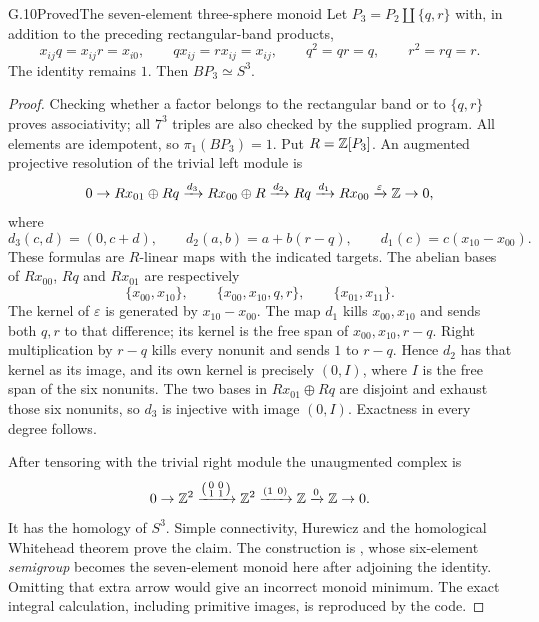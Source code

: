\begin{claim}{G.10}{Proved}{The seven-element three-sphere monoid}
Let $P_3=P_2\amalg\{q,r\}$ with, in addition to the preceding rectangular-band products,
\[
 x_{ij}q=x_{ij}r=x_{i0},\qquad qx_{ij}=rx_{ij}=x_{ij},
 \qquad q^2=qr=q,\qquad r^2=rq=r.
\]
The identity remains $1$. Then $BP_3\simeq S^3$.
\end{claim}
\begin{proof}
Checking whether a factor belongs to the rectangular band or to $\{q,r\}$ proves associativity; all $7^3$ triples are also checked by the supplied program. All elements are idempotent, so $\pi_1(BP_3)=1$. Put $R=\mathbb Z[P_3]$. An augmented projective resolution of the trivial left module is
\[
0\to Rx_{01}\oplus Rq
 \xrightarrow{d_3}Rx_{00}\oplus R
 \xrightarrow{d_2}Rq
 \xrightarrow{d_1}Rx_{00}
 \xrightarrow{\varepsilon}\mathbb Z\to0,
\]
where
\[
 d_3(c,d)=(0,c+d),\qquad d_2(a,b)=a+b(r-q),\qquad
 d_1(c)=c(x_{10}-x_{00}).
\]
These formulas are $R$-linear maps with the indicated targets. The abelian bases of $Rx_{00}$, $Rq$ and $Rx_{01}$ are respectively
\[
 \{x_{00},x_{10}\},\qquad \{x_{00},x_{10},q,r\},\qquad
 \{x_{01},x_{11}\}.
\]
The kernel of $\varepsilon$ is generated by $x_{10}-x_{00}$. The map $d_1$ kills $x_{00},x_{10}$ and sends both $q,r$ to that difference; its kernel is the free span of $x_{00},x_{10},r-q$. Right multiplication by $r-q$ kills every nonunit and sends $1$ to $r-q$. Hence $d_2$ has that kernel as its image, and its own kernel is precisely $(0,I)$, where $I$ is the free span of the six nonunits. The two bases in $Rx_{01}\oplus Rq$ are disjoint and exhaust those six nonunits, so $d_3$ is injective with image $(0,I)$. Exactness in every degree follows.

After tensoring with the trivial right module the unaugmented complex is
\[
0\to\mathbb Z^2\xrightarrow{\left(\begin{smallmatrix}0&0\\1&1\end{smallmatrix}\right)}
\mathbb Z^2\xrightarrow{(1\ 0)}\mathbb Z\xrightarrow{0}\mathbb Z\to0.
\]
It has the homology of $S^3$. Simple connectivity, Hurewicz and the homological Whitehead theorem prove the claim. The construction is \citet[Example 8.2, version~1]{Sweeney2025v1}, whose six-element \emph{semigroup} becomes the seven-element monoid here after adjoining the identity. Omitting that extra arrow would give an incorrect monoid minimum. The exact integral calculation, including primitive images, is reproduced by the code.
\end{proof}

